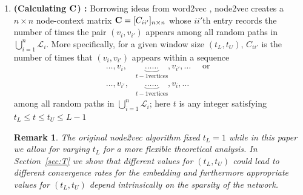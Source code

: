 \documentclass[10pt,journal,compsoc]{IEEEtran}
\newtheorem{remark}{Remark}
\newcommand{\M}[1]{{{\mathbf{\MakeUppercase{#1}}}}}
\numberwithin{equation}{section}
\begin{document}
\begin{enumerate}
\item {\bf (Calculating $\M C$) :} Borrowing ideas from word2vec
\cite{mikolov2013distributed}, node2vec creates a $n \times n$ node-context matrix $\M C = [C_{ii'}]_{n \times
    n}$ whose $ii'$th entry records
  the number of times the pair $(v_i,v_{i'})$ appears among
  all random paths in $\bigcup_{i = 1}^{n}\mathcal{L}_i$. More
  specifically, for a given window size $(t_L, t_U)$, 
  $C_{ii'}$ is the number of times that $(v_i,v_{i'})$ appears within a sequence 
\begin{equation}
    \label{node2vec:ii'}
    \begin{aligned}
\dots,v_i,&\underbrace{\dots\dots}_{t - 1 \text{vertices}},v_{i'},\dots \quad \text{ or } 
\\
\dots,v_{i'}, &\underbrace{\dots\dots}_{t - 1\text{vertices}}, v_i,\dots
\end{aligned}
\end{equation}
among all random paths in $\bigcup _{i = 1}^{n}\mathcal{L}_i$; here $t$ is any integer satisfying $t_L \leq t \leq t_U \leq L-1$   %
\begin{remark}
{\upshape
The original node2vec algorithm fixed $t_L = 1$ while in this paper we
allow for varying $t_L$ for a more flexible theoretical analysis. In Section~\ref{sec:T} we show that different values for $(t_L,t_U)$ could
lead to different convergence rates for the embedding and furthermore appropriate values for $(t_L, t_U)$ depend
intrinsically on the sparsity of the network.}
\end{remark}


\end{enumerate}
\end{document}
